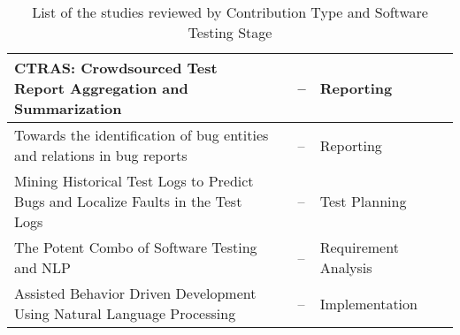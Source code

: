 \begin{appendices}
\begin{table}[H]
{\begin{tabular}{ |p{3cm}|p{3cm}|p{3cm}|p{3cm}|p{3cm}| }
            \hline CTRAS: Crowdsourced Test Report Aggregation and Summarization  & \cite{8811987} & --& Reporting\\
            \hline Towards the identification of bug entities and relations in bug reports & \cite{li2022towards} & --& Reporting\\
            \hline Mining Historical Test Logs to Predict Bugs and Localize Faults in the Test Logs & \cite{8812113} & --& Test Planning\\
            \hline The Potent Combo of Software Testing and NLP & \cite{mulla2020potent} & --& Requirement Analysis\\
            \hline Assisted Behavior Driven Development Using Natural Language Processing & \cite{soeken2012assisted} & --& Implementation\\
        \hline
    \end{tabular}%
    }
\caption*{List of the studies reviewed by Contribution Type and Software Testing Stage}
\end{table}


\end{appendices}
